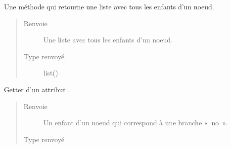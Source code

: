 \documentclass[letterpaper,10pt,french]{sphinxmanual}
\begin{document}
\begin{fulllineitems}
\begin{fulllineitems}
\end{fulllineitems}


\begin{fulllineitems}
\label{\detokenize{index:StrategyTree.Observation.get_list_of_children}}
Une méthode qui retourne une liste avec tous les enfants d’un noeud.
\begin{quote}\begin{description}
\item[{Renvoie}] \leavevmode
{} \textendash{} Une liste avec tous les enfants d’un noeud.

\item[{Type renvoyé}] \leavevmode
list({\hyperref[\detokenize{index:StrategyTree.NodeST}]{}})

\end{description}\end{quote}

\end{fulllineitems}


\begin{fulllineitems}
\label{\detokenize{index:StrategyTree.Observation.get_no_child}}
Getter d’un attribut .
\begin{quote}\begin{description}
\item[{Renvoie}] \leavevmode
{} \textendash{} Un enfant d’un noeud qui correspond à une branche « no ».

\item[{Type renvoyé}] \leavevmode
{\hyperref[\detokenize{index:StrategyTree.NodeST}]{}}

\end{description}\end{quote}

\end{fulllineitems}



\end{fulllineitems}
\end{document}
